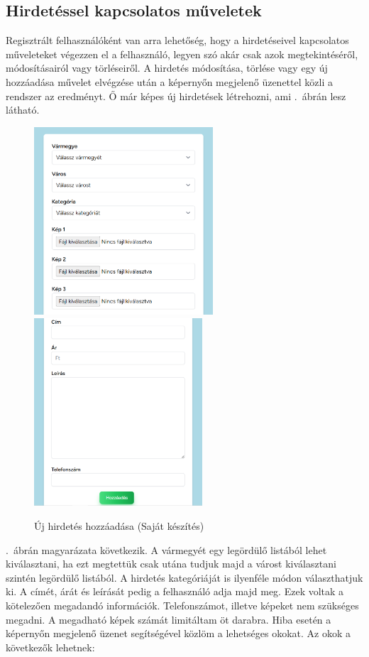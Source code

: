 \documentclass[]{thesis-ekf}
\theoremstyle{definition}
\theoremstyle{remark}
\begin{document}
	\subsection{Hirdetéssel kapcsolatos műveletek}
		Regisztrált felhasználóként van arra lehetőség, hogy a hirdetéseivel kapcsolatos műveleteket végezzen el a felhasználó, legyen szó akár csak azok megtekintéséről, módosításairól vagy törléseiről. A hirdetés módosítása, törlése vagy egy új hozzáadása művelet elvégzése után a képernyőn megjelenő üzenettel közli a rendszer az eredményt. Ő már képes új hirdetések létrehozni, ami .~ábrán lesz látható.
		\begin{figure}[ht!]
			\centering
			\includegraphics[height=7cm]{./felhasznaloi/hozzadas1}
			\includegraphics[height=7cm]{./felhasznaloi/hozzadas2}
			\caption{Új hirdetés hozzáadása (Saját készítés)} 
			\label{hirdetes-hozzadas-muvelet}
		\end{figure}
		.~ábrán magyarázata következik. A vármegyét egy legördülő listából lehet kiválasztani, ha ezt megtettük csak utána tudjuk majd a várost kiválasztani szintén legördülő listából. A hirdetés kategóriáját is ilyenféle módon választhatjuk ki. A címét, árát és leírását pedig a felhasználó adja majd meg. Ezek voltak a kötelezően megadandó információk. Telefonszámot, illetve képeket nem szükséges megadni. A megadható képek számát limitáltam öt darabra. Hiba esetén a képernyőn megjelenő üzenet segítségével közlöm a lehetséges okokat. Az okok a következők lehetnek:
\end{document}
